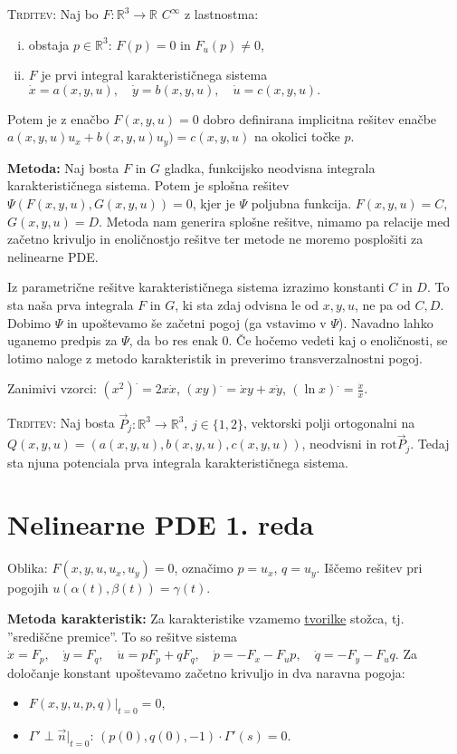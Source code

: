 \documentclass[10pt,a4paper]{amsart}
\theoremstyle{definition} %
\theoremstyle{plain} %
\newcommand{\R}{\mathbb R}
\begin{document}
\textsc{Trditev:} Naj bo $F : \R^3 \longrightarrow \R$ $C^{\infty}$ z
lastnostma:
\begin{enumerate}[(i)]
  \item obstaja $p \in \R^3$: $F(p)=0$ in
    $F_u(p) \neq 0$,
  \item $F$ je prvi integral karakterističnega sistema $
      \dot{x} =a(x,y,u),\quad \dot{y} =b(x,y,u) ,\quad \dot{u} =c(x,y,u).$
\end{enumerate}
Potem je z enačbo $F(x,y,u)=0 $ dobro definirana implicitna
  rešitev enačbe $a(x,y,u)u_x + b(x,y,u)u_y )= c(x,y,u)$ na okolici točke $p$.

\textbf{Metoda:} Naj bosta $F$ in $G$ gladka, funkcijsko neodvisna integrala
karakterističnega sistema. Potem je splošna rešitev $\Psi (F(x,y,u),G(x,y,u)) =
0$, kjer je $\Psi$ poljubna funkcija. $F(x,y,u) = C$, $G(x,y,u) = D$. Metoda nam
generira splošne rešitve, nimamo pa relacije med začetno krivuljo in
enoličnostjo rešitve ter metode ne moremo posplošiti za nelinearne PDE.

Iz parametrične rešitve karakterističnega sistema izrazimo konstanti $C$ in $D$.
To sta naša prva integrala $F$ in $G$, ki sta zdaj odvisna le od $x,y,u$, ne pa
od $C,D$. Dobimo $\Psi$ in upoštevamo še začetni pogoj (ga vstavimo v $\Psi$).
Navadno lahko uganemo predpis za $\Psi$, da bo res enak 0. Če hočemo vedeti kaj
o enoličnosti, se lotimo naloge z metodo karakteristik in preverimo
transverzalnostni pogoj.

Zanimivi vzorci: $(x^2)^. = 2x\dot{x}$, $(xy)^. = \dot{x}y + x\dot{y}$,
$(\ln{x})^. = \frac{\dot{x}}{x}$.

\textsc{Trditev:} Naj bosta $\vec{P}_j:\R^3 \longrightarrow \R^3$, $j \in
\{1,2\}$, vektorski polji ortogonalni na $Q(x,y,u) =
(a(x,y,u),b(x,y,u),c(x,y,u))$, neodvisni in $\text{rot}\vec{P}_j$. Tedaj sta
njuna potenciala prva integrala karakterističnega sistema.


\section*{Nelinearne PDE 1. reda}

Oblika: $F(x,y,u, u_x,u_y) = 0$, označimo $p = u_x$, $q = u_y$. Iščemo rešitev
pri pogojih $u(\alpha(t),\beta(t)) = \gamma(t)$.

\textbf{Metoda karakteristik:} Za karakteristike vzamemo \underline{tvorilke}
stožca, tj. ''središčne premice''. To so rešitve sistema $ \dot{x} =F_p ,\quad
\dot{y} =F_q ,\quad \dot{u} =pF_p + qF_q,\quad \dot{p} =-F_x - F_u p,\quad
\dot{q} =-F_y - F_u q.  $ Za določanje konstant upoštevamo začetno krivuljo in
dva naravna pogoja: \begin{itemize} \item $F(x,y,u,p,q)|_{t=0} = 0$, \item
      $\Gamma' \perp \vec{n}|_{t=0}$: $(p(0),q(0),-1) \cdot \Gamma'(s) = 0$.
  \end{itemize}
\end{document}
